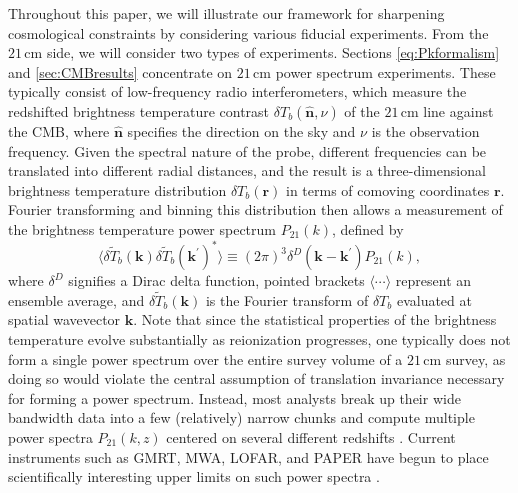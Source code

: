 \documentclass[twocolumn,aps,prd,nofootinbib,showpacs]{revtex4-1}
\begin{document}
Throughout this paper, we will illustrate our framework for sharpening cosmological constraints by considering various fiducial experiments. From the $21\,\textrm{cm}$ side, we will consider two types of experiments. Sections \ref{eq:Pkformalism} and \ref{sec:CMBresults} concentrate on $21\,\textrm{cm}$ power spectrum experiments. These typically consist of low-frequency radio interferometers, which measure the redshifted brightness temperature contrast $\delta T_b (\mathbf{\hat{n}}, \nu)$ of the $21\,\textrm{cm}$ line against the CMB, where $\mathbf{\hat{n}}$ specifies the direction on the sky and $\nu$ is the observation frequency. Given the spectral nature of the probe, different frequencies can be translated into different radial distances, and the result is a three-dimensional brightness temperature distribution $\delta T_b (\mathbf{r})$ in terms of comoving coordinates $\mathbf{r}$. Fourier transforming and binning this distribution then allows a measurement of the brightness temperature power spectrum $P_\textrm{21} (k)$, defined by
\begin{equation}
\label{eq:PspecDef}
\langle \delta \widetilde{T}_b(\mathbf{k}) \delta \widetilde{T}_b(\mathbf{k}^\prime)^* \rangle \equiv (2\pi)^3 \delta^D (\mathbf{k} - \mathbf{k}^\prime ) P_\textrm{21} (k),
\end{equation}
where $\delta^D$ signifies a Dirac delta function, pointed brackets $\langle \cdots \rangle$ represent an ensemble average, and $ \delta \widetilde{T}_b(\mathbf{k})$ is the Fourier transform of  $\delta T_b$ evaluated at spatial wavevector $\mathbf{k}$. Note that since the statistical properties of the brightness temperature evolve substantially as reionization progresses, one typically does not form a single power spectrum over the entire survey volume of a $21\,\textrm{cm}$ survey, as doing so would violate the central assumption of translation invariance necessary for forming a power spectrum. Instead, most analysts break up their wide bandwidth data into a few (relatively) narrow chunks and compute multiple power spectra $P_\textrm{21} (k,z)$ centered on several different redshifts \cite{Liu_in_prep}. Current instruments such as GMRT, MWA, LOFAR, and PAPER have begun to place scientifically interesting upper limits on such power spectra \cite{parsons_et_al2014,ali_et_al2015,pober_et_al2015,greig_et_al2015a}.
\end{document}
